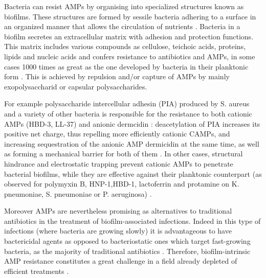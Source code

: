 Bacteria can resist AMPs by organising into specialized structures known as biofilms. These structures are formed by sessile bacteria adhering to a surface in an organized manner that allows the circulation of nutrients \cite{Costerton1999}.
%
Bacteria in a biofilm secretes an extracellular matrix with adhesion and protection functions. This matrix includes various compounds as cellulose, teichoic acids, proteins, lipids and nucleic acids \cite{Jolivet-Gougeon2014} and confers resistance to antibiotics and AMPs, in some cases 1000 times as great as the one developed by bacteria in their planktonic form \cite{Nickel1985,Mah2001}. This is achieved by repulsion and/or capture of AMPs by mainly exopolysaccharid or capsular polysaccharides.

For example polysaccharide intercellular adhesin (PIA) produced by S. aureus and a variety of other bacteria is responsible for the resistance to both cationic AMPs (HBD-3, LL-37) and anionic dermcidin \cite{Wang2004,Vuong2004PIA}: deacetylation of PIA increases its positive net charge, thus repelling more efficiently cationic CAMPs, and increasing sequestration of the anionic AMP dermicidin at the same time, as well as forming a mechanical barrier for both of them \cite{Vuong2004}.
%
In other cases, structural hindrance and electrostatic trapping prevent cationic AMPs to penetrate bacterial biofilms, while they are effective against their planktonic counterpart (as observed for polymyxin B, HNP-1,HBD-1, lactoferrin and protamine on K. pneumoniae, S. pneumoniae or P. aeruginosa) \cite{Campos2004,Llobet2008}.

Moreover AMPs are nevertheless promising as alternatives to traditional antibiotics in the treatment of biofilm-associated infections. Indeed in this type of infections (where bacteria are growing slowly) it is advantageous to have bactericidal agents as opposed to bacteriostatic ones which target fast-growing bacteria, as the majority of traditional antibiotics \cite{Batoni2011,Strempel2014}.
%
Therefore, biofilm-intrinsic AMP resistance constitutes a great challenge in a field already depleted of efficient treatments \cite{Joo2012,DiLuca2014}.

